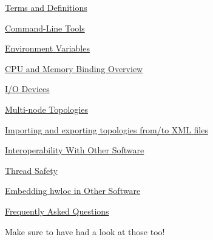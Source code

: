 \begin{DoxyItemize}
\item \hyperlink{a00001}{Terms and Definitions} 
\item \hyperlink{a00002}{Command-\/Line Tools} 
\item \hyperlink{a00003}{Environment Variables} 
\item \hyperlink{a00004}{CPU and Memory Binding Overview} 
\item \hyperlink{a00005}{I/O Devices} 
\item \hyperlink{a00006}{Multi-\/node Topologies} 
\item \hyperlink{a00007}{Importing and exporting topologies from/to XML files} 
\item \hyperlink{a00008}{Interoperability With Other Software} 
\item \hyperlink{a00009}{Thread Safety} 
\item \hyperlink{a00010}{Embedding hwloc in Other Software} 
\item \hyperlink{a00011}{Frequently Asked Questions} 
\end{DoxyItemize}

Make sure to have had a look at those too!

 
